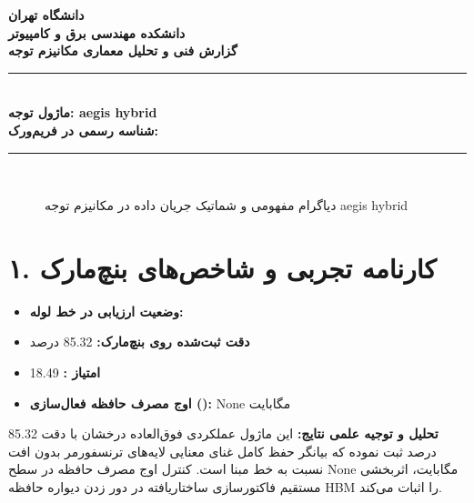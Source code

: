 \documentclass[12pt,a4paper]{article}
\begin{document}
\begin{center}
{\Large\bfseries دانشگاه تهران}\\[0.2cm]
{\large\bfseries دانشکده مهندسی برق و کامپیوتر}\\[0.2cm]
{\large\bfseries گزارش فنی و تحلیل معماری مکانیزم توجه}\\[0.5cm]
\rule{\linewidth}{1pt}\\[0.3cm]
{\LARGE\bfseries ماژول توجه: aegis hybrid}\\[0.2cm]
{\large \textbf{شناسه رسمی در فریم‌ورک:} }\\[0.2cm]
\rule{\linewidth}{1pt}\\[0.5cm]
\end{center}

\begin{figure}[H]
\centering
{}
\caption{دیاگرام مفهومی و شماتیک جریان داده در مکانیزم توجه aegis hybrid}
\end{figure}

\section*{۱. کارنامه تجربی و شاخص‌های بنچ‌مارک}
\begin{itemize}
\item \textbf{وضعیت ارزیابی در خط لوله:} 
\item \textbf{دقت ثبت‌شده روی بنچ‌مارک:} 85.32 درصد
\item \textbf{امتیاز :} 18.49
\item \textbf{اوج مصرف حافظه فعال‌سازی ():} None مگابایت
\end{itemize}
\textbf{تحلیل و توجیه علمی نتایج:} این ماژول عملکردی فوق‌العاده درخشان با دقت 85.32 درصد ثبت نموده که بیانگر حفظ کامل غنای معنایی لایه‌های ترنسفورمر بدون افت نسبت به خط مبنا است. کنترل اوج مصرف حافظه در سطح None مگابایت، اثربخشی مستقیم فاکتورسازی ساختاریافته در دور زدن دیواره حافظه HBM را اثبات می‌کند.
\end{document}
